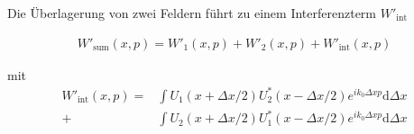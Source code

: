 \documentclass{article}
\begin{document}
Die \"Uberlagerung von zwei Feldern f\"uhrt zu einem Interferenzterm
$W'_\textrm{int}$

\begin{align}
  W'_\textrm{sum}(x,p) = W'_1(x,p) + W'_2(x,p) + W'_\textrm{int} (x,p)
\end{align}

mit 
\begin{align}
  W'_\textrm{int} (x,p) = 
  &\int U_1(x+\Delta x/2)  U^*_2(x-\Delta x/2) e^{i k_0 \Delta x p} \textrm{d} \Delta x \\
  + &\int U_2(x+\Delta x/2)  U^*_1(x-\Delta x/2) e^{i k_0 \Delta x p} \textrm{d} \Delta x
\end{align}
\end{document}
